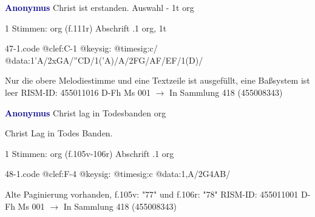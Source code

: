\documentclass[twocolumn]{book}
\begin{document}
\newline \par \vspace{7pt} \textcolor{darkblue}{\textbf{Anonymus  }}
\newline Christ ist erstanden. Auswahl - 1t
\newline org
\newline \begin{itshape}\end{itshape} 
\newline \textcolor{darkblue}{}  1 Stimmen: org  (f.111r)
\newline Abschrift
.1  org, 1t
\newline \begin{footnotesize}  \end{footnotesize}  
\begin{filecontents*}{47-1.code}
@clef:C-1
@keysig:
@timesig:c/
@data:1'A/2xGA/''CD/1('A)/A/2FG/AF/EF/1(D)/
\end{filecontents*}
\newline
%
\newline Nur die obere Melodiestimme und eine Textzeile ist ausgefüllt, eine Baßsystem ist leer
\newline RISM-ID: 455011016
\newline D-Fh  Ms 001
\newline $\rightarrow$ In Sammlung 418 (455008343)
      
\newline \par \vspace{7pt} \textcolor{darkblue}{\textbf{Anonymus  }}
\newline Christ lag in Todesbanden
\newline org
\newline \begin{itshape}[f.105v, heading:] Christ Lag in Todes Banden.\end{itshape} 
\newline \textcolor{darkblue}{}  1 Stimmen: org  (f.105v-106r)
\newline Abschrift
.1  org  
\begin{filecontents*}{48-1.code}
@clef:F-4
@keysig:
@timesig:c
@data:1,A/2G4AB/%
\end{filecontents*}
\newline
%
\newline Alte Paginierung vorhanden, f.105v: "77" und f.106r: "78"
\newline RISM-ID: 455011001
\newline D-Fh  Ms 001
\newline $\rightarrow$ In Sammlung 418 (455008343)
      
\end{document}
